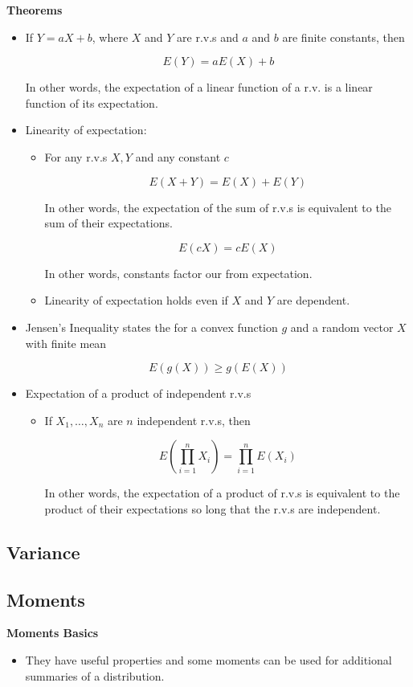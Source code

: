 \documentclass[11pt]{article}
\begin{document}
\textbf{Theorems}
\begin{itemize}
    \item If $Y = aX + b$, where $X$ and $Y$ are r.v.s and $a$ and $b$ are finite constants, then 
    
    \[E(Y)= aE(X) + b\]
    
    In other words, the expectation of a linear function of a r.v. is a linear function of its 
    expectation. 
    \item Linearity of expectation: 
    \begin{itemize}
        \item For any r.v.s $X, Y$ and any constant $c$ 
        
        \[E(X+Y) = E(X) + E(Y)\]

        In other words, the expectation of the sum of r.v.s is equivalent to the sum of their 
        expectations.

        \[E(cX) = cE(X)\]

        In other words, constants factor our from expectation.
        \item Linearity of expectation holds even if $X$ and $Y$ are dependent.
    \end{itemize}
    
    \item Jensen's Inequality states the for a convex function $g$ and a random vector $X$ 
    with finite mean

    \[E(g(X)) \ge g(E(X))\]
    
    \item Expectation of a product of independent r.v.s
    \begin{itemize}
        \item If $X_1, \ldots, X_n$ are $n$ independent r.v.s, then 
        
        \[ E(\prod_{i=1}^{n} X_i) = \prod_{i=1}^{n} E(X_i) \]
        
        In other words, the expectation of a product of r.v.s is equivalent to the product of 
        their expectations so long that the r.v.s are independent.
    \end{itemize}


    
\end{itemize}

\subsection{Variance}
\subsection{Moments}
\textbf{Moments Basics}
\begin{itemize}
    \item They have useful properties and some moments can be used for additional summaries of 
    a distribution. 
\end{itemize}
\end{document}
